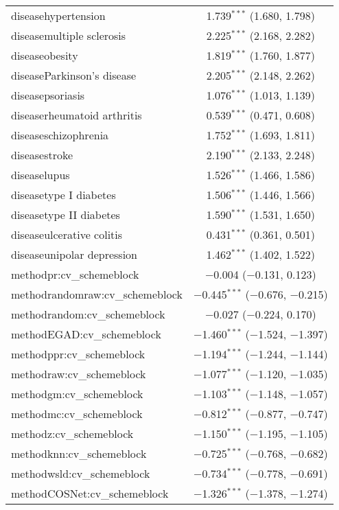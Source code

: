 \begin{table}[!htbp]
\begin{tabular}{@{\extracolsep{5pt}}lc}
  diseasehypertension & 1.739$^{***}$ (1.680, 1.798) \\ 
  diseasemultiple sclerosis & 2.225$^{***}$ (2.168, 2.282) \\ 
  diseaseobesity & 1.819$^{***}$ (1.760, 1.877) \\ 
  diseaseParkinson's disease & 2.205$^{***}$ (2.148, 2.262) \\ 
  diseasepsoriasis & 1.076$^{***}$ (1.013, 1.139) \\ 
  diseaserheumatoid arthritis & 0.539$^{***}$ (0.471, 0.608) \\ 
  diseaseschizophrenia & 1.752$^{***}$ (1.693, 1.811) \\ 
  diseasestroke & 2.190$^{***}$ (2.133, 2.248) \\ 
  diseaselupus & 1.526$^{***}$ (1.466, 1.586) \\ 
  diseasetype I diabetes & 1.506$^{***}$ (1.446, 1.566) \\ 
  diseasetype II diabetes & 1.590$^{***}$ (1.531, 1.650) \\ 
  diseaseulcerative colitis & 0.431$^{***}$ (0.361, 0.501) \\ 
  diseaseunipolar depression & 1.462$^{***}$ (1.402, 1.522) \\ 
  methodpr:cv\_schemeblock & $-$0.004 ($-$0.131, 0.123) \\ 
  methodrandomraw:cv\_schemeblock & $-$0.445$^{***}$ ($-$0.676, $-$0.215) \\ 
  methodrandom:cv\_schemeblock & $-$0.027 ($-$0.224, 0.170) \\ 
  methodEGAD:cv\_schemeblock & $-$1.460$^{***}$ ($-$1.524, $-$1.397) \\ 
  methodppr:cv\_schemeblock & $-$1.194$^{***}$ ($-$1.244, $-$1.144) \\ 
  methodraw:cv\_schemeblock & $-$1.077$^{***}$ ($-$1.120, $-$1.035) \\ 
  methodgm:cv\_schemeblock & $-$1.103$^{***}$ ($-$1.148, $-$1.057) \\ 
  methodmc:cv\_schemeblock & $-$0.812$^{***}$ ($-$0.877, $-$0.747) \\ 
  methodz:cv\_schemeblock & $-$1.150$^{***}$ ($-$1.195, $-$1.105) \\ 
  methodknn:cv\_schemeblock & $-$0.725$^{***}$ ($-$0.768, $-$0.682) \\ 
  methodwsld:cv\_schemeblock & $-$0.734$^{***}$ ($-$0.778, $-$0.691) \\ 
  methodCOSNet:cv\_schemeblock & $-$1.326$^{***}$ ($-$1.378, $-$1.274) \\ 

\end{tabular}
\end{table}
